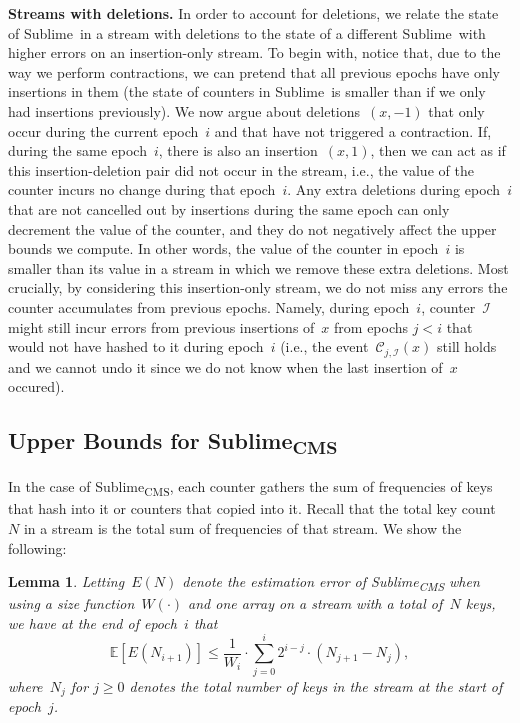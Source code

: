 \documentclass[sigconf]{acmart}
\newtheorem{lemma}[theorem]{Lemma}
\newcommand{\sketch}{Sublime}
\newcommand{\sketchcms}{\sketch\textsubscript{CMS}\xspace}
\newcommand{\expectation}[1]{\mathbb{E}\left[ #1 \right]}
\begin{document}
\medskip
\textbf{Streams with deletions.}
In order to account for deletions, we relate the state of \sketch\ in a stream
with deletions to the state of a different \sketch\ with higher errors on an
insertion-only stream. To begin with, notice that, due to the way we perform
contractions, we can pretend that all previous epochs have only insertions in
them (the state of counters in \sketch\ is smaller than if we only had
insertions previously). We now argue about deletions~$(x,-1)$ that only occur
during the current epoch~$i$ and that have not triggered a contraction. If,
during the same epoch~$i$, there is also an insertion~$(x,1)$, then we can act
as if this insertion-deletion pair did not occur in the stream, i.e., the value
of the counter incurs no change during that epoch~$i$. Any extra deletions
during epoch~$i$ that are not cancelled out by insertions during the same epoch
can only decrement the value of the counter, and they do not negatively affect
the upper bounds we compute. In other words, the value of the counter in
epoch~$i$ is smaller than its value in a stream in which we remove these extra
deletions. Most crucially, by considering this insertion-only stream, we do not
miss any errors the counter accumulates from previous epochs. Namely, during
epoch~$i$, counter~$\mathcal{I}$ might still incur errors from previous
insertions of~$x$ from epochs $j<i$ that would not have hashed to it during
epoch~$i$ (i.e., the event~$\mathcal{C}_{j,\mathcal{I}}(x)$ still holds and we
cannot undo it since we do not know when the last insertion of~$x$ occured).

\subsection{Upper Bounds for \sketchcms}\label{sec:upper_bounds_cms}
In the case of \sketchcms, each counter gathers the sum of frequencies of keys
that hash into it or counters that copied into it. Recall that the total key
count~$N$ in a stream is the total sum of frequencies of that stream. We show
the following:
\begin{lemma}\label{lemma:cms-w}
    Letting~$E(N)$ denote the estimation error of \sketchcms when using a size
    function~$W(\cdot)$ and one array on a stream with a total of~$N$ keys, we
    have at the end of epoch~$i$ that
	$$ \expectation{E(N_{i+1})} \leq  \frac{1}{W_i} \cdot \sum_{j=0}^i  2^{i-j} \cdot (N_{j+1} - N_j), $$
    where~$N_{j}$ for $j\geq 0$ denotes the total number of keys in the stream
    at the start of epoch~$j$. 
\end{lemma}
\end{document}
